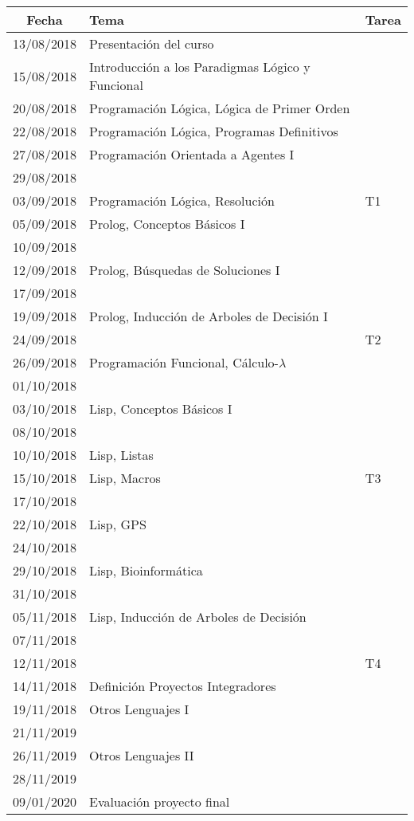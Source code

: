 \documentclass[10pt]{article}
\begin{document}
\begin{center}
  \begin{tabular}{cll}
    \textbf{Fecha} & \textbf{Tema} & \textbf{Tarea} \\
    \hline
    13/08/2018 & Presentación del curso & \\
    15/08/2018 & Introducción a los Paradigmas Lógico y Funcional & \\
    20/08/2018 & Programación Lógica, Lógica de Primer Orden & \\
    22/08/2018 & Programación Lógica, Programas Definitivos & \\
    27/08/2018 & Programación Orientada a Agentes I & \\
    29/08/2018 & &  \\
    03/09/2018 & Programación Lógica, Resolución & T1 \\
    05/09/2018 & Prolog, Conceptos Básicos I & \\
    10/09/2018 & &  \\
    12/09/2018 & Prolog, Búsquedas de Soluciones I & \\
    17/09/2018 & & \\
    19/09/2018 & Prolog, Inducción de Arboles de Decisión I & \\
    24/09/2018 & & T2 \\
    26/09/2018 & Programación Funcional,  Cálculo-$\lambda$ & \\
    01/10/2018 &  & \\
    03/10/2018 & Lisp, Conceptos Básicos I & \\
    08/10/2018 & & \\
    10/10/2018 & Lisp, Listas & \\
    15/10/2018 & Lisp, Macros & T3 \\
    17/10/2018 & & \\
    22/10/2018 & Lisp, GPS & \\
    24/10/2018 & & \\
    29/10/2018 & Lisp, Bioinformática & \\
    31/10/2018 & & \\ 
    05/11/2018 & Lisp, Inducción de Arboles de Decisión & \\
    07/11/2018 & & \\
    12/11/2018 & &  T4 \\
    14/11/2018 & Definición Proyectos Integradores & \\
    19/11/2018 & Otros Lenguajes I & \\
    21/11/2019 & & \\
    26/11/2019 & Otros Lenguajes II & \\
    28/11/2019 & & \\
    09/01/2020 & Evaluación proyecto final & \\
    \hline
  \end{tabular}
\end{center}
\end{document}
